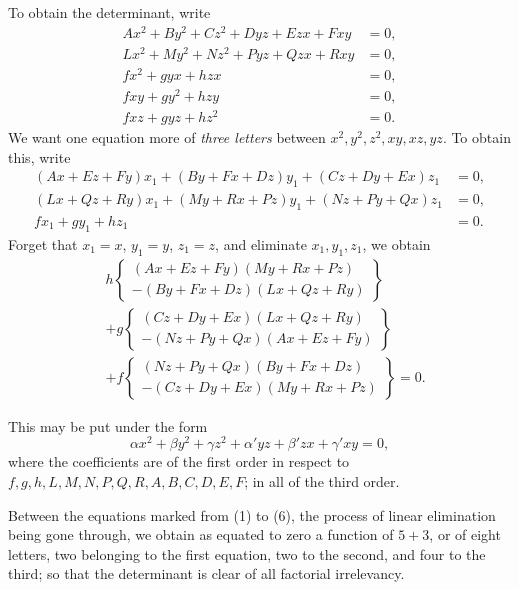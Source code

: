 \documentclass[11pt]{article}
\newcommand{\sourcepage}[1]{\marginpar{\scriptsize p.~#1}}
\begin{document}
To obtain the determinant, write
\begin{align}
 Ax^2+By^2+Cz^2+Dyz+Ezx+Fxy&=0,\tag{1}\\
 Lx^2+My^2+Nz^2+Pyz+Qzx+Rxy&=0,\tag{2}\\
 fx^2+gyx+hzx&=0,\tag{3}\\
 fxy+gy^2+hzy&=0,\tag{4}\\
 fxz+gyz+hz^2&=0.\tag{5}
\end{align}
We want one equation more of \emph{three letters} between $x^2,y^2,z^2,xy,xz,yz$. To obtain this, write
\begin{align*}
(Ax+Ez+Fy)x_1+(By+Fx+Dz)y_1+(Cz+Dy+Ex)z_1&=0,\\
(Lx+Qz+Ry)x_1+(My+Rx+Pz)y_1+(Nz+Py+Qx)z_1&=0,\\
fx_1+gy_1+hz_1&=0.
\end{align*}
Forget that $x_1=x$, $y_1=y$, $z_1=z$, and eliminate $x_1,y_1,z_1$, we obtain
\[
\begin{aligned}
&h\left\{\begin{array}{l}
(Ax+Ez+Fy)(My+Rx+Pz)\\[-1mm]
-(By+Fx+Dz)(Lx+Qz+Ry)
\end{array}\right\}\\
&+g\left\{\begin{array}{l}
(Cz+Dy+Ex)(Lx+Qz+Ry)\\[-1mm]
-(Nz+Py+Qx)(Ax+Ez+Fy)
\end{array}\right\}\\
&+f\left\{\begin{array}{l}
(Nz+Py+Qx)(By+Fx+Dz)\\[-1mm]
-(Cz+Dy+Ex)(My+Rx+Pz)
\end{array}\right\}=0.
\end{aligned}
\]

\sourcepage{64}
This may be put under the form
\begin{equation}
 \alpha x^2+\beta y^2+\gamma z^2+\alpha'yz+\beta'zx+\gamma'xy=0,\tag{6}
\end{equation}
where the coefficients are of the first order in respect to $f,g,h,L,M,N,P,Q,R,A,B,C,D,E,F$; in all of the third order.

Between the equations marked from (1) to (6), the process of linear elimination being gone through, we obtain as equated to zero a function of $5+3$, or of eight letters, two belonging to the first equation, two to the second, and four to the third; so that the determinant is clear of all factorial irrelevancy.
\end{document}
